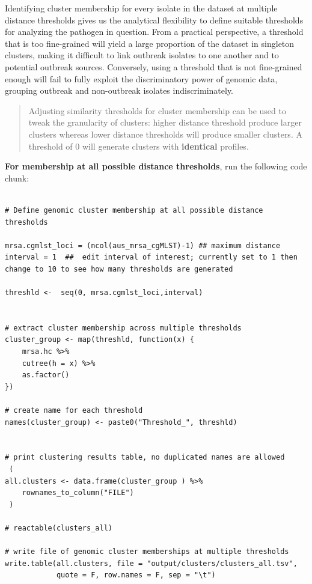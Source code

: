 \documentclass[
]{book}
\begin{document}
Identifying cluster membership for every isolate in the dataset at multiple distance thresholds gives us the analytical flexibility to define suitable thresholds for analyzing the pathogen in question. From a practical perspective, a threshold that is too fine-grained will yield a large proportion of the dataset in singleton clusters, making it difficult to link outbreak isolates to one another and to potential outbreak sources. Conversely, using a threshold that is not fine-grained enough will fail to fully exploit the discriminatory power of genomic data, grouping outbreak and non-outbreak isolates indiscriminately.

\begin{quote}
Adjusting similarity thresholds for cluster membership can be used to tweak the granularity of clusters: higher distance threshold produce larger clusters whereas lower distance thresholds will produce smaller clusters. A threshold of 0 will generate clusters with \textbf{identical} profiles.
\end{quote}

\textbf{For membership at all possible distance thresholds}, run the following code chunk:

\begin{verbatim}

# Define genomic cluster membership at all possible distance thresholds

mrsa.cgmlst_loci = (ncol(aus_mrsa_cgMLST)-1) ## maximum distance 
interval = 1  ##  edit interval of interest; currently set to 1 then change to 10 to see how many thresholds are generated

threshld <-  seq(0, mrsa.cgmlst_loci,interval)


# extract cluster membership across multiple thresholds
cluster_group <- map(threshld, function(x) {
    mrsa.hc %>% 
    cutree(h = x) %>% 
    as.factor()
})

# create name for each threshold
names(cluster_group) <- paste0("Threshold_", threshld)


# print clustering results table, no duplicated names are allowed
 (
all.clusters <- data.frame(cluster_group ) %>%
    rownames_to_column("FILE")
 )  

# reactable(clusters_all)

# write file of genomic cluster memberships at multiple thresholds
write.table(all.clusters, file = "output/clusters/clusters_all.tsv",
            quote = F, row.names = F, sep = "\t")
\end{verbatim}
\end{document}

